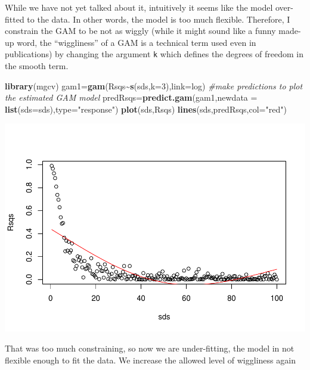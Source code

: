 \documentclass[
]{book}
\newenvironment{Shaded}{\begin{snugshade}}{\end{snugshade}}
\newcommand{\AttributeTok}[1]{\textcolor[rgb]{0.13,0.29,0.53}{#1}}
\newcommand{\CommentTok}[1]{\textcolor[rgb]{0.56,0.35,0.01}{\textit{#1}}}
\newcommand{\DecValTok}[1]{\textcolor[rgb]{0.00,0.00,0.81}{#1}}
\newcommand{\FunctionTok}[1]{\textcolor[rgb]{0.13,0.29,0.53}{\textbf{#1}}}
\newcommand{\NormalTok}[1]{#1}
\newcommand{\OtherTok}[1]{\textcolor[rgb]{0.56,0.35,0.01}{#1}}
\newcommand{\SpecialCharTok}[1]{\textcolor[rgb]{0.81,0.36,0.00}{\textbf{#1}}}
\newcommand{\StringTok}[1]{\textcolor[rgb]{0.31,0.60,0.02}{#1}}
\begin{document}
While we have not yet talked about it, intuitively it seems like the model over-fitted to the data. In other words, the model is too much flexible. Therefore, I constrain the GAM to be not as wiggly (while it might sound like a funny made-up word, the ``wiggliness'' of a GAM is a technical term used even in publications) by changing the argument \texttt{k} which defines the degrees of freedom in the smooth term.

\begin{Shaded}
\begin{Highlighting}[]
\FunctionTok{library}\NormalTok{(mgcv)}
\NormalTok{gam1}\OtherTok{=}\FunctionTok{gam}\NormalTok{(Rsqs}\SpecialCharTok{\textasciitilde{}}\FunctionTok{s}\NormalTok{(sds,}\AttributeTok{k=}\DecValTok{3}\NormalTok{),}\AttributeTok{link=}\NormalTok{log)}
\CommentTok{\#make predictions to plot the estimated GAM model}
\NormalTok{predRsqs}\OtherTok{=}\FunctionTok{predict.gam}\NormalTok{(gam1,}\AttributeTok{newdata =} \FunctionTok{list}\NormalTok{(}\AttributeTok{sds=}\NormalTok{sds),}\AttributeTok{type=}\StringTok{"response"}\NormalTok{)}
\FunctionTok{plot}\NormalTok{(sds,Rsqs)}
\FunctionTok{lines}\NormalTok{(sds,predRsqs,}\AttributeTok{col=}\StringTok{"red"}\NormalTok{)}
\end{Highlighting}
\end{Shaded}

\includegraphics{ECOMODbook_files/figure-latex/a6.33-1.pdf}

That was too much constraining, so now we are under-fitting, the model in not flexible enough to fit the data. We increase the allowed level of wiggliness again
\end{document}
